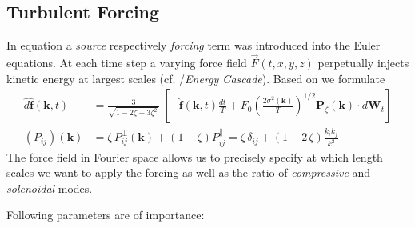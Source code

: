\subsection{Turbulent Forcing}
\label{sec:turbuforcing}

In equation  a \emph{source} respectively
\emph{forcing} term was introduced into the Euler equations. At each time step
a varying force field $\vec{F}(t,x,y,z)$ perpetually injects kinetic energy at
largest scales (cf. /\emph{Energy Cascade}). Based on
\cite{schmidt2009} we formulate
\begin{align}
  \hat{d\mathbf{f}}(\mathbf{k},t) &= \frac{3}{\sqrt{1-2\zeta+3\zeta^2\,}}\;\left[-\hat{\mathbf{f}}(\mathbf{k},t)\frac{dt}{T} + F_0 \left(\frac{2\sigma^2(\mathbf{k})}{T}\right)^{1/2}\mathbf{P}_\zeta(\mathbf{k})\cdot d\mathbf{W}_t\right]\\
  (P_{ij})(\mathbf{k}) &= \zeta\,P_{ij}^\perp(\mathbf{k}) + (1-\zeta) P_{ij}^\parallel =\zeta\,\delta_{ij} + (1-2\,\zeta) \frac{k_i k_j}{k^2}
\end{align}
The force field in Fourier space allows us to precisely specify at which
length scales we want to apply the forcing as well as the ratio of
\emph{compressive} and \emph{solenoidal} modes.

Following parameters are of importance:

